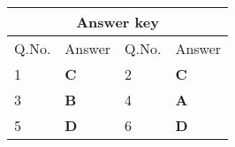 \setlength\arrayrulewidth{1pt}
\begin{table}[H]
	\centering
	\begin{tabular}{|p{1.5cm}|p{1.5cm}||p{1.5cm}|p{1.5cm}|}
		\hline
		\multicolumn{4}{|c|}{\textbf{Answer key}}\\\hline\hline
		\rowcolor{ocrel}Q.No.&Answer&Q.No.&Answer\\\hline
		1&\textbf{C} &2&\textbf{C}\\\hline 
		3&\textbf{B} &4&\textbf{A} \\\hline
		5&\textbf{D} &6 &\textbf{D} \\\hline
		
		
	\end{tabular}
\end{table}